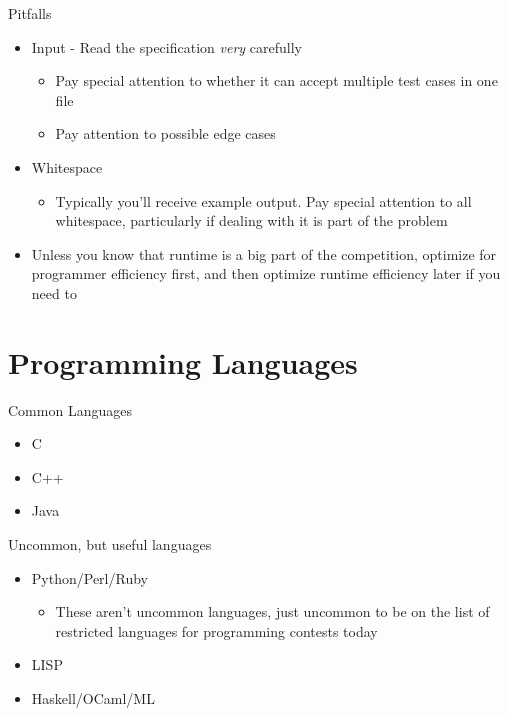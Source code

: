 \documentclass{beamer}
\begin{document}
\begin{frame}{Pitfalls}
  \begin{centering}
    \begin{itemize}
      \item Input - Read the specification \textit{very} carefully
      \begin{itemize}
        \item Pay special attention to whether it can accept multiple test cases in one file
        \item Pay attention to possible edge cases
      \end{itemize}
      \item Whitespace
      \begin{itemize}
        \item Typically you'll receive example output. Pay special attention to all whitespace, particularly if dealing with it is part of the problem
      \end{itemize}

      \item Unless you know that runtime is a big part of the competition, optimize for programmer efficiency first, and then optimize runtime efficiency later if you need to
    \end{itemize}
  \end{centering}
\end{frame}

\section{Programming Languages}

\begin{frame}{Common Languages}
  \begin{centering}
    \begin{itemize}
     \item C
     \item C++
     \item Java
    \end{itemize}
  \end{centering}
\end{frame}

\begin{frame}{Uncommon, but useful languages}
  \begin{centering}
    \begin{itemize}
      \item Python/Perl/Ruby
      \begin{itemize}
        \item These aren't uncommon languages, just uncommon to be on the list of restricted languages for programming contests today
      \end{itemize}
      \item LISP
      \item Haskell/OCaml/ML
    \end{itemize}
  \end{centering}
\end{frame}
\end{document}
